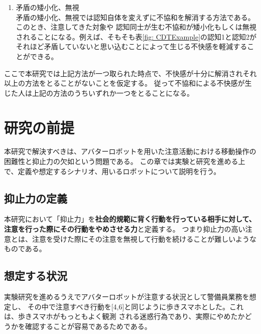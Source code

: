 \documentclass{kuisthesis}
\begin{document}
\begin{enumerate}
\begin{table}[H]
\end{table}

  \item 矛盾の矮小化、無視 \\
  矛盾の矮小化、無視では認知自体を変えずに不協和を解消する方法である。このとき、注意してきた対象や
  認知同士が生む不協和が矮小化もしくは無視されることになる。例えば、そもそも表\ref{fig: CDTExample}の認知1と認知2が
それほど矛盾していないと思い込むことによって生じる不快感を軽減することができる。

\end{enumerate}
\vspace{3mm}

ここで本研究では上記方法が一つ取られた時点で、不快感が十分に解消されそれ以上の方法をとることがないことを仮定する。
従って不協和による不快感が生じた人は上記の方法のうちいずれか一つをとることになる。

\section{研究の前提}
本研究で解決すべきは、アバターロボットを用いた注意活動における移動操作の困難性と抑止力の欠如という問題である。
この章では実験と研究を進める上で、定義や想定するシナリオ、用いるロボットについて説明を行う。

\subsection{抑止力の定義}
本研究において「抑止力」を\textbf{社会的規範に背く行動を行っている相手に対して、注意を行った際にその行動をやめさせる力}と定義する。
つまり抑止力の高い注意とは、注意を受けた際にその注意を無視して行動を続けることが難しいようなものである。

\subsection{想定する状況}
実験研究を進めるうえでアバターロボットが注意する状況として警備員業務を想定し、
その中で注意すべき行動を[4,6]と同じように歩きスマホとした。これは、歩きスマホがもっともよく観測
される迷惑行為であり、実際にやめたかどうかを確認することが容易であるためである。
\end{document}
